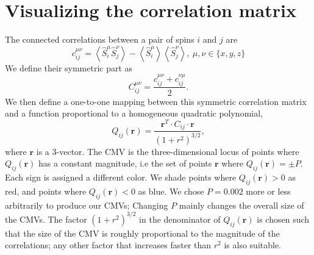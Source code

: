 \documentclass[pra,reprint,superscriptaddress]{revtex4-1}
\newcommand{\expect}[1]{\left\langle #1 \right\rangle}
\newcommand{\hS}{\hat{S}}
\begin{document}
\section{Visualizing the correlation matrix}\label{sec: CMV}
The connected correlations between a pair of spins $i$ and $j$ are
\begin{equation}
c_{ij}^{\mu\nu} = \expect{\hS_i^\mu \hS_j^\nu}-\expect{\hS_i^\mu}\expect{\hS_j^\nu},\ \mu,\nu\in\{x,y,z\}
\end{equation}
We define their symmetric part as
\begin{equation}
C_{ij}^{\mu\nu} = \frac{c_{ij}^{\mu\nu} + c_{ij}^{\nu\mu}}{2}.\label{eqn: C}
\end{equation}
We then define a one-to-one mapping between this symmetric correlation matrix and a function proportional to a homogeneous quadratic polynomial,
\begin{equation}
Q_{ij}(\mathbf{r}) = \frac{\mathbf{r}^T\cdot C_{ij}\cdot\mathbf{r}}{(1+r^2)^{3/2}},
\end{equation}
where $\mathbf{r}$ is a $3$-vector. The CMV is the three-dimensional locus of points where $Q_{ij}(\mathbf{r})$ has a constant magnitude, i.e the set of points $\mathbf{r}$ where $Q_{ij}(\mathbf{r}) = \pm P$. Each sign is assigned a different color. We shade points where $Q_{ij}(\mathbf{r})>0$ as red, and points where $Q_{ij}(\mathbf{r})<0$ as blue. We chose $P=0.002$ more or less arbitrarily to produce our CMVs; Changing $P$ mainly changes the overall size of the CMVs. The factor $(1+r^2)^{3/2}$ in the denominator of $Q_{ij}(\mathbf{r})$ is chosen such that the size of the CMV is roughly proportional to the magnitude of the correlations; any other factor that increases faster than $r^2$ is also suitable.
\end{document}
